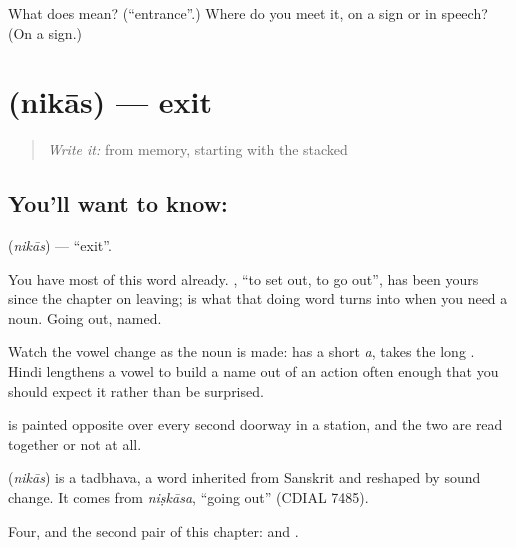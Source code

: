 \begin{tcolorbox}[breakable,colback=teal!4,colframe=teal!35!black,title={Before you move on}]
What does  mean? (\textquotedblleft{}entrance\textquotedblright{}.) Where do you meet it, on a sign or in speech? (On a sign.)
\end{tcolorbox}
\section[\texorpdfstring{\hi{निकास} (nikās)}{निकास (nikās)}]{ (nikās) — exit}

\label{lesson:HI-C74-exit}



\begin{quote}
\emph{Write it:} \textbf{} from memory, starting with the stacked 
\end{quote}

\subsection*{You'll want to know: }
\textbf{} (\emph{nikās}) — \textquotedblleft{}exit\textquotedblright{}.

You have most of this word already. \textbf{}, \textquotedblleft{}to set out, to go out\textquotedblright{}, has been yours since the chapter on leaving;  is what that doing word turns into when you need a noun. Going out, named.

Watch the vowel change as the noun is made: \textbf{} has a short \emph{a}, \textbf{} takes the long . Hindi lengthens a vowel to build a name out of an action often enough that you should expect it rather than be surprised.

 is painted opposite  over every second doorway in a station, and the two are read together or not at all.

\begin{cousinweb}
\textbf{} (\emph{nikās}) is a tadbhava, a word inherited from Sanskrit and reshaped by sound change. It comes from \emph{niṣkāsa}, \textquotedblleft{}going out\textquotedblright{} (CDIAL 7485).
\end{cousinweb}

\begin{grammarlens}[title={What you've built}]
Four, and the second pair of this chapter:  and .
\end{grammarlens}

